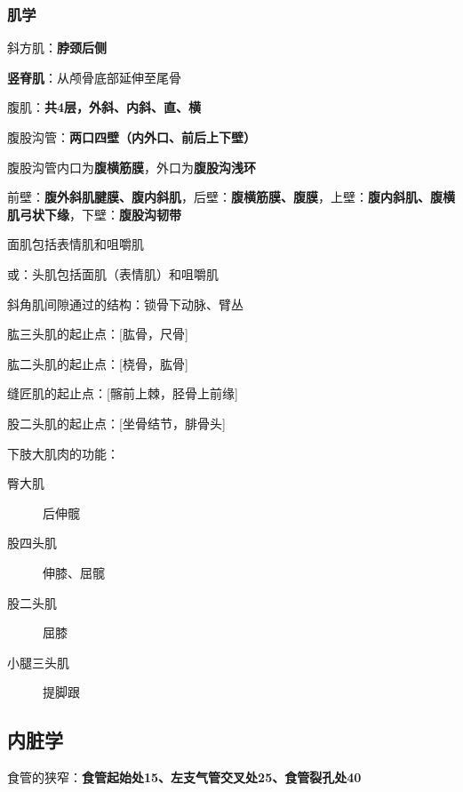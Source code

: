\subsubsection{肌学}%
\label{subsub:复习：肌学}
\begin{notation}
    斜方肌：\textbf{脖颈后侧}

    \textbf{竖脊肌}：从颅骨底部延伸至尾骨

    腹肌：\textbf{共4层，外斜、内斜、直、横}
\end{notation}
\begin{notation}
    腹股沟管：\textbf{两口四壁（内外口、前后上下壁）}
\end{notation}
\begin{notation}
    腹股沟管内口为\textbf{腹横筋膜}，外口为\textbf{腹股沟浅环}

    前壁：\textbf{腹外斜肌腱膜、腹内斜肌}，后壁：\textbf{腹横筋膜、腹膜}，上壁：\textbf{腹内斜肌、腹横肌弓状下缘}，下壁：\textbf{腹股沟韧带}
\end{notation}
\begin{notation}
    面肌包括表情肌和咀嚼肌

    或：头肌包括面肌（表情肌）和咀嚼肌
\end{notation}
\begin{notation}
    斜角肌间隙通过的结构：锁骨下动脉、臂丛
\end{notation}
\begin{notation}
    肱三头肌的起止点：[肱骨，尺骨]

    肱二头肌的起止点：[桡骨，肱骨]

    缝匠肌的起止点：[髂前上棘，胫骨上前缘]

    股二头肌的起止点：[坐骨结节，腓骨头]
\end{notation}
\begin{notation}
    下肢大肌肉的功能：
    \begin{description}
        \item[臀大肌] 后伸髋
        \item [股四头肌] 伸膝、屈髋
        \item [股二头肌] 屈膝
        \item [小腿三头肌] 提脚跟
    \end{description}
\end{notation}
\subsection{内脏学}%
\label{sub:复习：内脏学}
\begin{notation}
    食管的狭窄：\textbf{食管起始处15、左支气管交叉处25、食管裂孔处40}
\end{notation}
